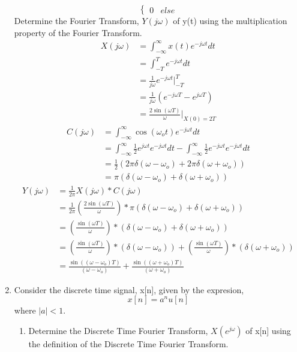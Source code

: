\documentclass{article}
\begin{document}
\begin{enumerate}
\begin{equation}
\begin{cases}
        0 & else
        \end{cases}
    \end{equation}
    Determine the Fourier Transform, $Y(j\omega)$ of y(t) using the multiplication property of the Fourier Transform.
    \begin{align}
        X(j\omega) &= \int_{-\infty}^\infty x(t)e^{-j\omega t}dt\\
        &= \int_{-T}^T e^{-j\omega t}dt\\
        &= \frac{1}{j\omega}e^{-j\omega t}\bigg|_{-T}^T\\
        &= \frac{1}{j\omega}\left(e^{-j\omega T}-e^{j\omega T}\right)\\
        &= \frac{2\sin(\omega T)}{\omega}\bigg|_{X(0)=2T}
    \end{align}
    \begin{align}
        C(j\omega) &= \int_{-\infty}^\infty\cos(\omega_ot)e^{-j\omega t}dt\\
        &= \int_{-\infty}^\infty\frac{1}{2}e^{j\omega t}e^{-j\omega t}dt -\int_{-\infty}^\infty\frac{1}{2}e^{-j\omega t}e^{-j\omega t}dt\\
        &= \frac{1}{2}(2\pi\delta(\omega-\omega_o)+2\pi\delta(\omega+\omega_o))\\
        &= \pi(\delta(\omega-\omega_o)+\delta(\omega+\omega_o))
    \end{align}
    \begin{align}
        Y(j\omega) &= \frac{1}{2\pi}X(j\omega)*C(j\omega)\\
        &= \frac{1}{2\pi}(\frac{2\sin(\omega T)}{\omega})*\pi(\delta(\omega-\omega_o)+\delta(\omega+\omega_o))\\
        &= (\frac{\sin(\omega T)}{\omega})*(\delta(\omega-\omega_o)+\delta(\omega+\omega_o))\\
        &= (\frac{\sin(\omega T)}{\omega})*(\delta(\omega-\omega_o))+(\frac{\sin(\omega T)}{\omega})*(\delta(\omega+\omega_o))\\
        &= \boxed{\frac{\sin((\omega-\omega_o) T)}{(\omega-\omega_o)}+\frac{\sin((\omega+\omega_o) T)}{(\omega+\omega_o)}}
    \end{align}
    \newpage
    \item Consider the discrete time signal, x[n], given by the expresion,
    \begin{equation}
        x[n] = a^nu[n] 
    \end{equation}
    where $|a| < 1$.
    \begin{enumerate}
        \item Determine the Discrete Time Fourier Transform, $X(e^{j\omega})$ of x[n] using the definition of the Discrete Time Fourier Transform.

\end{enumerate}
\end{enumerate}
\end{document}
